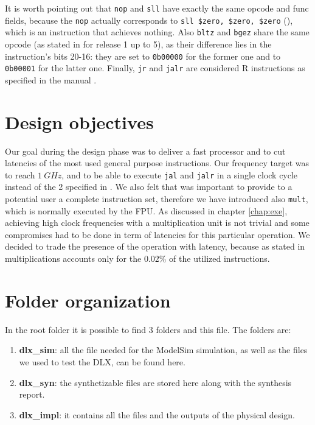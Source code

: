 It is worth pointing out that \verb|nop| and \verb|sll| have exactly the same opcode and func fields,
because the \verb|nop| actually corresponds to \verb|sll $zero, $zero, $zero| (\cite{MIPS64_arch}), which is an instruction that achieves nothing.
Also \verb|bltz| and \verb|bgez| share the same opcode (as stated in \cite{MIPS64_arch} for release 1 up to 5), as their difference lies in the
instruction's bits 20-16: they are set to \verb|0b00000| for the former one and to \verb|0b00001| for the latter one.
Finally, \verb|jr| and \verb|jalr| are considered R instructions as specified in the manual \cite{MIPS64_arch}.

\section{Design objectives}

Our goal during the design phase was to deliver a fast processor and to cut latencies of the most used general purpose instructions. Our frequency target
was to reach $1\ GHz$, and to be able to execute \verb|jal| and \verb|jalr| in a single clock cycle instead of the 2 specified in
\cite{MIPS64_arch}. We also felt that was important to provide to a potential user a complete instruction set, therefore we have introduced also \verb|mult|,
which is normally executed by the FPU. As discussed in chapter \ref{chap:exe}, achieving high clock frequencies with a multiplication unit is not trivial and
some compromises had to be done in term of latencies for this particular operation. We decided to trade the presence of the operation with latency, because as
stated in \cite{code_stats} multiplications accounts only for the $0.02\%$ of the utilized instructions.

\section{Folder organization}

In the root folder it is possible to find 3 folders and this file. The folders are:

\begin{enumerate}
    \item \textbf{dlx\_sim}: all the file needed for the ModelSim simulation, as well as the files we used to test the DLX, can be found here.
    \item \textbf{dlx\_syn}: the synthetizable files are stored here along with the synthesis report.
    \item \textbf{dlx\_impl}: it contains all the files and the outputs of the physical design.
\end{enumerate}

